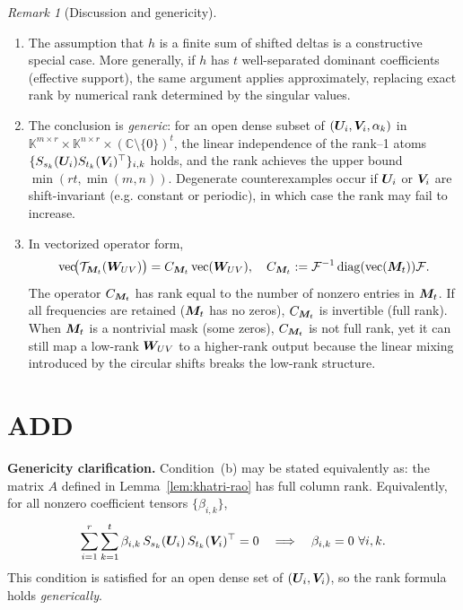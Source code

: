 \documentclass{article}
\theoremstyle{plain}
\theoremstyle{definition}
\theoremstyle{remark}
\newtheorem{remark}[theorem]{Remark}
\begin{document}
\begin{remark}[Discussion and genericity]
\begin{enumerate}
\item 
The assumption that $h$ is a finite sum of shifted deltas is a constructive special case. 
More generally, if $h$ has $t$ well-separated dominant coefficients (effective support), the same argument applies approximately, replacing exact rank by numerical rank determined by the singular values.

\item 
The conclusion is \emph{generic}: for an open dense subset of $({\bm{U}}_i,{\bm{V}}_i,\alpha_k)$ in $\mathbb{K}^{m\times r}\!\times\!\mathbb{K}^{n\times r}\!\times\!(\mathbb{C}\setminus\{0\})^t$, 
the linear independence of the rank--1 atoms 
$\{S_{s_k}({\bm{U}}_i)S_{t_k}({\bm{V}}_i)^\top\}_{i,k}$ holds, and the rank achieves the upper bound $\min(r t,\min(m,n))$. 
Degenerate counterexamples occur if ${\bm{U}}_i$ or ${\bm{V}}_i$ are shift-invariant (e.g. constant or periodic), in which case the rank may fail to increase.

\item 
In vectorized operator form, 
\begin{align}
\mathrm{vec}\!\big(\mathcal{T}_{{\bm{M}}_t}({\bm{W}}_{UV})\big)
   = C_{{\bm{M}}_t}\,\mathrm{vec}({\bm{W}}_{UV}),
   \quad C_{{\bm{M}}_t} := \mathcal{F}^{-1} \operatorname{diag}(\mathrm{vec}({\bm{M}}_t)) \mathcal{F}.
\end{align}
The operator $C_{{\bm{M}}_t}$ has rank equal to the number of nonzero entries in ${\bm{M}}_t$.
If all frequencies are retained (${\bm{M}}_t$ has no zeros), $C_{{\bm{M}}_t}$ is invertible (full rank).
When ${\bm{M}}_t$ is a nontrivial mask (some zeros), $C_{{\bm{M}}_t}$ is not full rank, yet it can still map a low-rank ${\bm{W}}_{UV}$ to a higher-rank output 
because the linear mixing introduced by the circular shifts breaks the low-rank structure.
\end{enumerate}
\end{remark}

\section{ADD}


\noindent\textbf{Genericity clarification.}
Condition~(b) may be stated equivalently as: 
the matrix $A$ defined in Lemma~\ref{lem:khatri-rao} has full column rank.
Equivalently, for all nonzero coefficient tensors $\{\beta_{i,k}\}$,
\begin{align}
  \sum_{i=1}^r\sum_{k=1}^t
     \beta_{i,k}\,S_{s_k}({\bm{U}}_i)\,S_{t_k}({\bm{V}}_i)^\top = 0
  \quad\Longrightarrow\quad
  \beta_{i,k}=0~\forall i,k.
\end{align}
This condition is satisfied for an open dense set of $({\bm{U}}_i,{\bm{V}}_i)$,
so the rank formula holds \emph{generically}.
\end{document}
